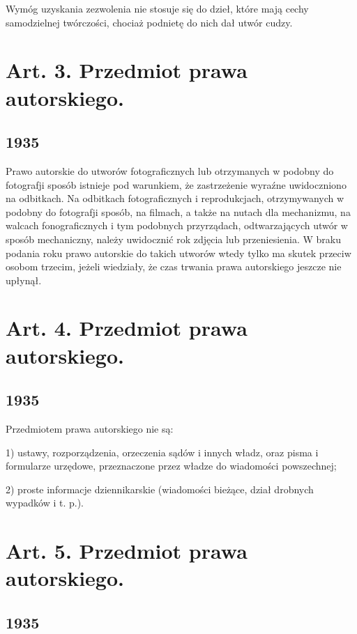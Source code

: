 \documentclass[withmarginpar]{book}
\begin{document}
Wymóg uzyskania zezwolenia nie stosuje się do dzieł, które mają cechy
samodzielnej twórczości, chociaż podnietę do nich dał utwór cudzy.

\section{Art. 3.  Przedmiot prawa autorskiego.}
\label{sec:art.-3}

\subsection{1935}
\label{sec:art.-3-1}

Prawo autorskie do utworów fotograficznych lub otrzymanych w podobny
do fotografji sposób istnieje pod warunkiem, że zastrzeżenie wyraźne
uwidoczniono na odbitkach. Na odbitkach fotograficznych i
reprodukcjach, otrzymywanych w podobny do fotografji sposób, na
filmach, a także na nutach dla mechanizmu, na walcach fonograficznych
i tym podobnych przyrządach, odtwarzających utwór w sposób
mechaniczny, należy uwidocznić rok zdjęcia lub przeniesienia. W braku
podania roku prawo autorskie do takich utworów wtedy tylko ma skutek
przeciw osobom trzecim, jeżeli wiedziały, że czas trwania prawa
autorskiego jeszcze nie upłynął.

\section{Art. 4. Przedmiot prawa autorskiego.}
\label{sec:art.-4}

\subsection{1935}
\label{sec:art.-4-1}

Przedmiotem prawa autorskiego nie są:

1) ustawy, rozporządzenia, orzeczenia sądów i innych władz, oraz pisma
i formularze urzędowe, przeznaczone przez władze do wiadomości
powszechnej;

2) proste informacje dziennikarskie (wiadomości bieżące, dział
drobnych wypadków i t. p.).

\section{Art. 5. Przedmiot prawa autorskiego.}
\label{sec:art.-5}

\subsection{1935}
\label{sec:art.-5-1}
\end{document}

